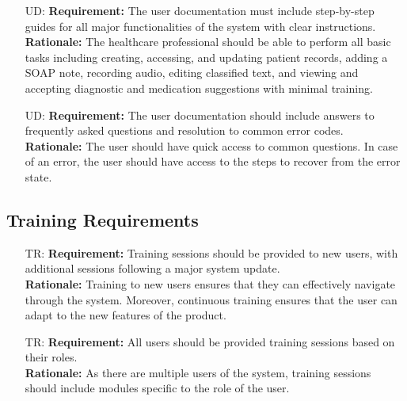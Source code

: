 \documentclass[12pt]{article}
\newcounter{udnum} %
\newcounter{trnum} %
\begin{document}
\begin{itemize}
\begin{itemize}
  \item [UD\refstepcounter{udnum}\theudnum \label{UD_doc2}:] 
  \textbf{Requirement:} The user documentation must include step-by-step guides for all major functionalities of the system with clear instructions. \\
  \textbf{Rationale:} The healthcare professional should be able to perform all basic tasks including creating, accessing, and updating patient records, adding a SOAP note, recording audio, editing classified text, and viewing and accepting diagnostic and medication suggestions with minimal training.\\

  \item [UD\refstepcounter{udnum}\theudnum \label{UD_doc3}:] 
  \textbf{Requirement:} The user documentation should include answers to frequently asked questions and resolution to common error codes.\\
  \textbf{Rationale:} The user should have quick access to common questions. In case of an error, the user should have access to the steps to recover from the error state.\\ 
\end{itemize}

\subsection{Training Requirements}
\begin{itemize}

  \item [TR\refstepcounter{trnum}\thetrnum \label{TR_tr1}:] 
  \textbf{Requirement:} Training sessions should be provided to new users, with additional sessions following a major system update.\\
  \textbf{Rationale:} Training to new users ensures that they can effectively navigate through the system. Moreover, continuous training ensures that the user can adapt to the new features of the product. \\ 

  \item [TR\refstepcounter{trnum}\thetrnum \label{TR_tr2}:] 
  \textbf{Requirement:} All users should be provided training sessions based on their roles.\\
  \textbf{Rationale:} As there are multiple users of the system, training sessions should include modules specific to the role of the user.\\ 
\end{itemize}


\end{itemize}
\end{document}
